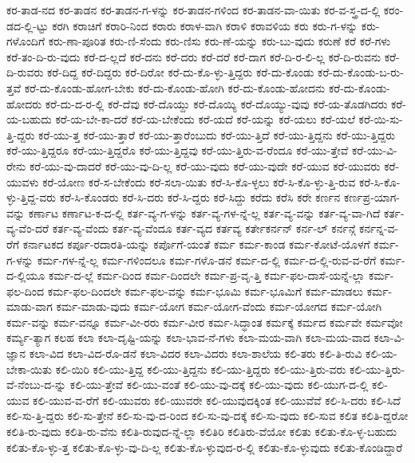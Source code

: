 {ಕರ-ತಾಡ-ನದ
ಕರ-ತಾಡನ
ಕರ-ತಾಡನ-ಗ-ಳನ್ನು
ಕರ-ತಾಡನ-ಗಳಿಂದ
ಕರ-ತಾಡನ-ವಾ-ಯಿತು
ಕರ-ವ-ಸ್ತ್ರ-ದ-ಲ್ಲಿ
ಕರಂ-ಡದ-ಲ್ಲಿ-ಟ್ಟು
ಕರಗಿ
ಕರಾಚಿಗೆ
ಕರಾರಿ-ನಿಂದ
ಕರಾರು
ಕರಾಳ-ವಾಗಿ
ಕರಾಳಿ
ಕರಾವಳಿಯ
ಕರು
ಕರು-ಗ-ಳನ್ನು
ಕರು-ಗಳೊಂದಿಗೆ
ಕರು-ಣಾ-ಪೂರಿತ
ಕರು-ಣಿ-ಸೆಂದು
ಕರು-ಣಿಸು
ಕರು-ಣೆ-ಯನ್ನು
ಕರು-ಬು-ವುದು
ಕರುಣೆ
ಕರೆ
ಕರೆ-ಗಳು
ಕರೆ-ತಂ-ದಿ-ರು-ವುದು
ಕರೆ-ದ-ಲ್ಲದೆ
ಕರೆ-ದನು
ಕರೆ-ದರು
ಕರೆ-ದರೆ
ಕರೆ-ದಾಗ
ಕರೆ-ದಿ-ರ-ಲಿ-ಲ್ಲ
ಕರೆ-ದಿ-ರುವನು
ಕರೆ-ದಿ-ರುವರು
ಕರೆ-ದಿದ್ದ
ಕರೆ-ದಿದ್ದರು
ಕರೆ-ದಿರೋ
ಕರೆ-ದು-ಕೊ-ಳ್ಳು-ತ್ತಿದ್ದರು
ಕರೆ-ದು-ಕೊಂಡು
ಕರೆ-ದು-ಕೊಂಡು-ಬ-ರು-ತ್ತವೆ
ಕರೆ-ದು-ಕೊಂಡು-ಹೋಗ-ಬೇಕು
ಕರೆ-ದು-ಕೊಂಡು-ಹೋಗಿ
ಕರೆ-ದು-ಕೊಂಡು-ಹೋದನು
ಕರೆ-ದು-ಕೊಂಡು-ಹೋದರು
ಕರೆ-ದು-ದ-ರ-ಲ್ಲಿ
ಕರೆ-ದೆವು
ಕರೆ-ದೊಯ್ದು
ಕರೆ-ದೊಯ್ಯಿ
ಕರೆ-ದೊಯ್ಯು-ವುವು
ಕರೆ-ಯ-ತೊಡಗಿದರು
ಕರೆ-ಯ-ಬಹುದು
ಕರೆ-ಯ-ಬೇ-ಕಾ-ದರೆ
ಕರೆ-ಯ-ಬೇಕೆಂದು
ಕರೆ-ಯದೆ
ಕರೆ-ಯನ್ನು
ಕರೆ-ಯಲು
ಕರೆ-ಯಲೆ
ಕರೆ-ಯಿ-ಸು-ತ್ತಿ-ದ್ದರು
ಕರೆ-ಯು-ತ್ತ
ಕರೆ-ಯು-ತ್ತಾರೆ
ಕರೆ-ಯು-ತ್ತಾರೆಂಬುದು
ಕರೆ-ಯು-ತ್ತಿದೆ
ಕರೆ-ಯು-ತ್ತಿದ್ದನು
ಕರೆ-ಯು-ತ್ತಿದ್ದರು
ಕರೆ-ಯು-ತ್ತಿದ್ದರೂ
ಕರೆ-ಯು-ತ್ತಿದ್ದರೊ
ಕರೆ-ಯು-ತ್ತಿದ್ದವು
ಕರೆ-ಯು-ತ್ತಿರು-ವ-ರೆಂದೂ
ಕರೆ-ಯು-ತ್ತೇವೆ
ಕರೆ-ಯು-ವಿ-ರೇನು
ಕರೆ-ಯು-ವು-ದಾದರೆ
ಕರೆ-ಯು-ವು-ದಿ-ಲ್ಲ
ಕರೆ-ಯು-ವುದು
ಕರೆ-ಯು-ವುದೇ
ಕರೆ-ಯುವ
ಕರೆ-ಯುವರು
ಕರೆ-ಯುವಳು
ಕರೆ-ಯೋಣ
ಕರೆ-ಸ-ಬೇಕೆಂದು
ಕರೆ-ಸಲಾ-ಯಿತು
ಕರೆ-ಸಿ-ಕೊ-ಳ್ಳಲು
ಕರೆ-ಸಿ-ಕೊ-ಳ್ಳು-ತ್ತಿ-ರುವ
ಕರೆ-ಸಿ-ಕೊ-ಳ್ಳು-ತ್ತಿದ್ದ-ವರು
ಕರೆ-ಸಿ-ಕೊಂಡರು
ಕರೆ-ಸಿ-ದರು
ಕರೆ-ಸಿ-ದ್ದರು
ಕರೆ-ಸಿದ್ದು
ಕರೆದು
ಕರೆಸಿ
ಕರೇ
ಕರ್ಣನ
ಕರ್ಣಪ್ರ-ಯಾಗ-ವನ್ನು
ಕರ್ಣಾಟ
ಕರ್ಣಾಟ-ಕ-ದ-ಲ್ಲಿ
ಕರ್ತ-ವ್ಯ-ಗ-ಳನ್ನು
ಕರ್ತ-ವ್ಯ-ಗಳ-ನ್ನೆ-ಲ್ಲ
ಕರ್ತ-ವ್ಯ-ವನ್ನು
ಕರ್ತ-ವ್ಯ-ವಾ-ಗಿದೆ
ಕರ್ತ-ವ್ಯ-ವೆಂ-ದರೆ
ಕರ್ತ-ವ್ಯ-ವೆಂದು
ಕರ್ತ-ವ್ಯ-ವೆಂದೂ
ಕರ್ತ-ವ್ಯದ
ಕರ್ತವ್ಯ
ಕರ್ತೇಕರ್ನನ್
ಕರ್ನ-ಲ್
ಕರ್ನನ್ಗೆ
ಕರ್ನನ್ನ-ವ-ರೆಗೆ
ಕರ್ನಾಟಕದ
ಕರ್ಪೂ-ರದಾರತಿ-ಯನ್ನು
ಕರ್ಪೊಗೆ-ಯಂತೆ
ಕರ್ಮ
ಕರ್ಮ-ಕಾಂಡ
ಕರ್ಮ-ಕೋಟೆ-ಯೊಳಗೆ
ಕರ್ಮ-ಗ-ಳನ್ನು
ಕರ್ಮ-ಗಳ-ನ್ನೆ-ಲ್ಲ
ಕರ್ಮ-ಗಳಿಂದಲೂ
ಕರ್ಮ-ಗಳೊ-ಡನೆ
ಕರ್ಮ-ದ-ಲ್ಲಿ
ಕರ್ಮ-ದ-ಲ್ಲಿ-ರುವ-ವ-ರೆಗೆ
ಕರ್ಮ-ದ-ಲ್ಲಿಯೂ
ಕರ್ಮ-ದ-ಲ್ಲೆ
ಕರ್ಮ-ದಿಂದ
ಕರ್ಮ-ದಿಂದಲೇ
ಕರ್ಮ-ಪ್ರ-ವೃ-ತ್ತಿ
ಕರ್ಮ-ಫಲ-ದಾಸೆ-ಯನ್ನೆ-ಲ್ಲಾ
ಕರ್ಮ-ಫಲ-ದಿಂದ
ಕರ್ಮ-ಫಲ-ದಿಂದಲೇ
ಕರ್ಮ-ಫಲ-ವನ್ನು
ಕರ್ಮ-ಭೂಮಿ
ಕರ್ಮ-ಭೂಮಿಗೆ
ಕರ್ಮ-ಮಾಡಲು
ಕರ್ಮ-ಮಾಡು-ವಾಗ
ಕರ್ಮ-ಮಾಡು-ವುದು
ಕರ್ಮ-ಯೋಗ
ಕರ್ಮ-ಯೋಗ-ವೆಂದು
ಕರ್ಮ-ಯೋಗದ
ಕರ್ಮ-ಯೋಗಿ
ಕರ್ಮ-ವನ್ನು
ಕರ್ಮ-ವನ್ನೂ
ಕರ್ಮ-ವೀ-ರರು
ಕರ್ಮ-ವೀರ
ಕರ್ಮ-ಸಿದ್ಧಾಂತ
ಕರ್ಮಕ್ಕೆ
ಕರ್ಮದ
ಕರ್ಮವೇ
ಕರ್ಮವೋ
ಕರ್ಮ್ಯ-ತ್ಯಾಗ
ಕಲಹ
ಕಲಾ
ಕಲಾ-ದೃಷ್ಟಿ-ಯನ್ನು
ಕಲಾ-ಭಾವ-ನೆ-ಗಳು
ಕಲಾ-ಮಯ-ವಾಗಿ
ಕಲಾ-ಮಯ-ವಾದ
ಕಲಾ-ವಿ-ಜ್ಞಾನ
ಕಲಾ-ವಿದ
ಕಲಾ-ವಿದ-ರೊ-ಡನೆ
ಕಲಾ-ವಿದರ
ಕಲಾ-ವಿದರು
ಕಲಾ-ಶಾಲೆಯ
ಕಲಿ-ತರು
ಕಲಿ-ತಿ-ರುವಿ
ಕಲಿ-ಯ-ಬೇಕಾ-ಯಿತು
ಕಲಿ-ಯಿರಿ
ಕಲಿ-ಯು-ತ್ತಿದ್ದ
ಕಲಿ-ಯು-ತ್ತಿದ್ದನು
ಕಲಿ-ಯು-ತ್ತಿದ್ದರು
ಕಲಿ-ಯು-ತ್ತಿರು-ವರು
ಕಲಿ-ಯು-ತ್ತಿರು-ವೆ-ನೆಂಬು-ದ-ನ್ನು
ಕಲಿ-ಯು-ತ್ತೇವೆ
ಕಲಿ-ಯು-ವಂತೆ
ಕಲಿ-ಯು-ವು-ದಕ್ಕೆ
ಕಲಿ-ಯು-ವುದು
ಕಲಿ-ಯುಗ-ದ-ಲ್ಲಿ
ಕಲಿ-ಯುವ
ಕಲಿ-ಯುವ-ವ-ರೆಗೆ
ಕಲಿ-ಯುವರು
ಕಲಿ-ಯುವರೇ
ಕಲಿ-ಯುವುದಕ್ಕಿಂತ
ಕಲಿ-ಯುವೆವೆ
ಕಲಿ-ಸಿ-ದರು
ಕಲಿ-ಸಿದೆ
ಕಲಿ-ಸು-ತ್ತಿ-ದ್ದರು
ಕಲಿ-ಸು-ತ್ತೇನೆ
ಕಲಿ-ಸು-ವು-ದ-ರಿಂದ
ಕಲಿ-ಸು-ವು-ದಕ್ಕೆ
ಕಲಿ-ಸು-ವುದು
ಕಲಿ-ಸುವ
ಕಲಿತ
ಕಲಿತಿ-ದ್ದರೋ
ಕಲಿತಿ-ರು-ವುದು
ಕಲಿತಿ-ರು-ವೆನು
ಕಲಿತಿ-ರುವುದ-ನ್ನೆ-ಲ್ಲಾ
ಕಲಿತಿರಿ
ಕಲಿತಿರು-ವೆಯೋ
ಕಲಿತು
ಕಲಿತು-ಕೊ-ಳ್ಳ-ಬಹುದು
ಕಲಿತು-ಕೊ-ಳ್ಳು-ತ್ತ
ಕಲಿತು-ಕೊ-ಳ್ಳು-ವು-ದಿ-ಲ್ಲ
ಕಲಿತು-ಕೊ-ಳ್ಳುವುದ-ರ-ಲ್ಲಿ
ಕಲಿತು-ಕೊ-ಳ್ಳುವುದು
ಕಲಿತು-ಕೊಂಡಿದ್ದಾರೆ
}
